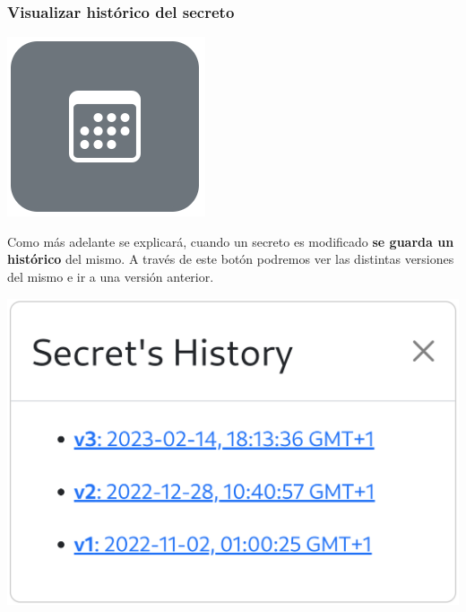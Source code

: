 \documentclass{\ClassPath/viu-tfm-template}
\begin{document}
\subsubsection*{Visualizar histórico del secreto}
{
\begin{minipage}{0.1\linewidth}
    \includegraphics[width=\linewidth]{img/calendar.png}
\end{minipage}
\hspace{0.5cm}
\begin{minipage}{0.9\linewidth}
    Como más adelante se explicará, cuando un secreto es modificado \textbf{se guarda un histórico} del mismo. A través de este botón podremos ver las distintas versiones del mismo e ir a una versión anterior.
\end{minipage}
}

\begin{center}
    \includegraphics[width=0.6\linewidth]{img/history.png}
\end{center}
\end{document}
